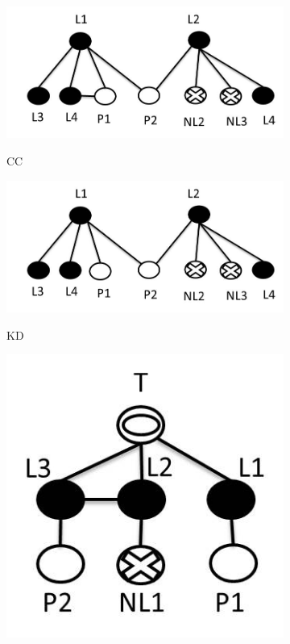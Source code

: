 \documentclass[prodmode,acmtecs]{acmsmall} %
\begin{document}
\begin{figure}
\centering
\begin{subfigure}{.39\textwidth}
\centering
  \includegraphics[width=\linewidth]{cc.jpg}\\
   \caption{CC}\label{fig:cc}
\end{subfigure}
\begin{subfigure}{.39\textwidth}
\centering
  \includegraphics[width=\linewidth]{KD_NEW.jpg}\\
   \caption{KD}\label{fig:kd}
\end{subfigure}
\begin{subfigure}{.19\textwidth}
  \centering
  \includegraphics[width=\linewidth]{FM_BTF.jpg}\\

\end{subfigure}
\end{figure}
\end{document}
